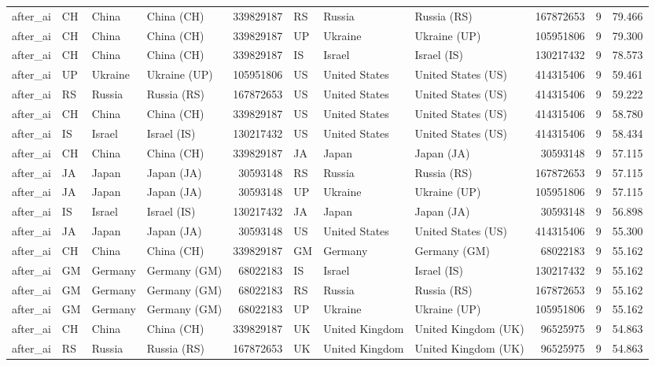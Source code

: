 \begin{tabular}{llllrlllrrr}
after\_ai & CH & China & China (CH) & 339829187 & RS & Russia & Russia (RS) & 167872653 & 9 & 79.466 \\
after\_ai & CH & China & China (CH) & 339829187 & UP & Ukraine & Ukraine (UP) & 105951806 & 9 & 79.300 \\
after\_ai & CH & China & China (CH) & 339829187 & IS & Israel & Israel (IS) & 130217432 & 9 & 78.573 \\
after\_ai & UP & Ukraine & Ukraine (UP) & 105951806 & US & United States & United States (US) & 414315406 & 9 & 59.461 \\
after\_ai & RS & Russia & Russia (RS) & 167872653 & US & United States & United States (US) & 414315406 & 9 & 59.222 \\
after\_ai & CH & China & China (CH) & 339829187 & US & United States & United States (US) & 414315406 & 9 & 58.780 \\
after\_ai & IS & Israel & Israel (IS) & 130217432 & US & United States & United States (US) & 414315406 & 9 & 58.434 \\
after\_ai & CH & China & China (CH) & 339829187 & JA & Japan & Japan (JA) & 30593148 & 9 & 57.115 \\
after\_ai & JA & Japan & Japan (JA) & 30593148 & RS & Russia & Russia (RS) & 167872653 & 9 & 57.115 \\
after\_ai & JA & Japan & Japan (JA) & 30593148 & UP & Ukraine & Ukraine (UP) & 105951806 & 9 & 57.115 \\
after\_ai & IS & Israel & Israel (IS) & 130217432 & JA & Japan & Japan (JA) & 30593148 & 9 & 56.898 \\
after\_ai & JA & Japan & Japan (JA) & 30593148 & US & United States & United States (US) & 414315406 & 9 & 55.300 \\
after\_ai & CH & China & China (CH) & 339829187 & GM & Germany & Germany (GM) & 68022183 & 9 & 55.162 \\
after\_ai & GM & Germany & Germany (GM) & 68022183 & IS & Israel & Israel (IS) & 130217432 & 9 & 55.162 \\
after\_ai & GM & Germany & Germany (GM) & 68022183 & RS & Russia & Russia (RS) & 167872653 & 9 & 55.162 \\
after\_ai & GM & Germany & Germany (GM) & 68022183 & UP & Ukraine & Ukraine (UP) & 105951806 & 9 & 55.162 \\
after\_ai & CH & China & China (CH) & 339829187 & UK & United Kingdom & United Kingdom (UK) & 96525975 & 9 & 54.863 \\
after\_ai & RS & Russia & Russia (RS) & 167872653 & UK & United Kingdom & United Kingdom (UK) & 96525975 & 9 & 54.863 \\

\end{tabular}
